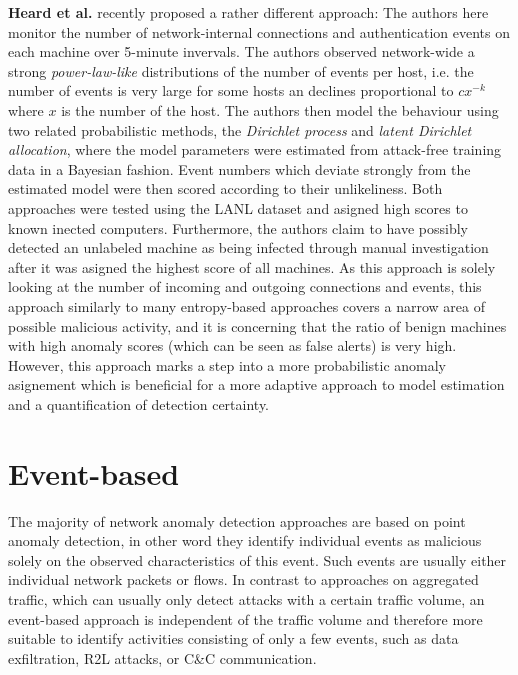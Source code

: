 \documentclass[a4paper,12pt,twoside]{report}
\begin{document}
\textbf{Heard et al.} \cite{heard2016network, heard2016topic} recently proposed a rather different approach: The authors here monitor the number of network-internal connections and authentication events on each machine over 5-minute invervals. The authors observed network-wide a strong \textit{power-law-like} distributions of the number of events per host, i.e. the number of events is very large for some hosts an declines proportional to $c x^{-k}$ where $x$ is the number of the host. The authors then model the behaviour using two related probabilistic methods, the \textit{Dirichlet process} and \textit{latent Dirichlet allocation}, where the model parameters were estimated from attack-free training data in a Bayesian fashion. Event numbers which deviate strongly from the estimated model were then scored according to their unlikeliness. Both approaches were tested using the LANL dataset and asigned high scores to known inected computers. Furthermore, the authors claim to have possibly detected an unlabeled machine as being infected through manual investigation after it was asigned the highest score of all machines. As this approach is solely looking at the number of incoming and outgoing connections and events, this approach similarly to many entropy-based approaches covers a narrow area of possible malicious activity, and it is concerning that the ratio of benign machines with high anomaly scores (which can be seen as false alerts) is very high. However, this approach marks a step into a more probabilistic anomaly asignement which is beneficial for a more adaptive approach to model estimation and a quantification of detection certainty.





\section{Event-based}

The majority of network anomaly detection approaches are based on point anomaly detection, in other word they identify individual events as malicious solely on the observed characteristics of this event. Such events are usually either individual network packets or flows. In contrast to approaches on aggregated traffic, which can usually only detect attacks with a certain traffic volume, an event-based approach is independent of the traffic volume and therefore more suitable to identify activities consisting of only a few events, such as data exfiltration, R2L attacks, or C\&C communication.
\end{document}
